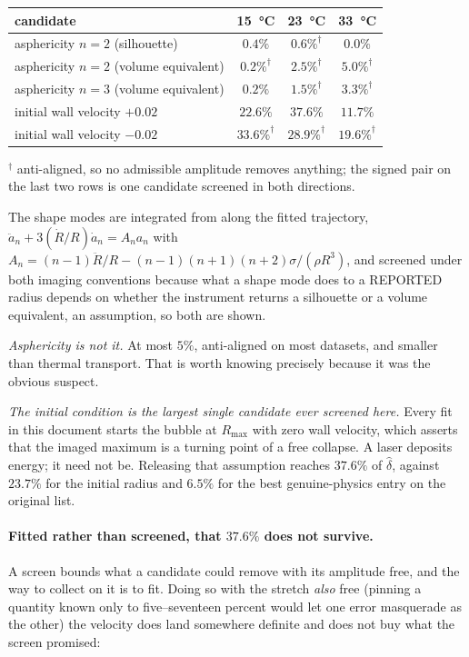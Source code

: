 \documentclass[10pt]{article}
\begin{document}
\begin{center}
\begin{tabular}{lccc}
\toprule
candidate & \SI{15}{\celsius} & \SI{23}{\celsius} & \SI{33}{\celsius} \\
\midrule
asphericity $n=2$ (silhouette) & $0.4\%$ & $0.6\%^\dagger$ & $0.0\%$ \\
asphericity $n=2$ (volume equivalent) & $0.2\%^\dagger$ & $2.5\%^\dagger$ & $5.0\%^\dagger$ \\
asphericity $n=3$ (volume equivalent) & $0.2\%$ & $1.5\%^\dagger$ & $3.3\%^\dagger$ \\
initial wall velocity $+0.02$ & $\mathbf{22.6\%}$ & $\mathbf{37.6\%}$ & $\mathbf{11.7\%}$ \\
initial wall velocity $-0.02$ & $33.6\%^\dagger$ & $28.9\%^\dagger$ & $19.6\%^\dagger$ \\
\bottomrule
\end{tabular}
\end{center}

\noindent $^\dagger$ anti-aligned, so no admissible amplitude removes anything; the signed pair
on the last two rows is one candidate screened in both directions.

The shape modes are integrated from \citet{plesset1954stability} along the fitted trajectory,
$\ddot a_n + 3(\dot R/R)\dot a_n = A_n a_n$ with
$A_n = (n-1)\ddot R/R - (n-1)(n+1)(n+2)\sigma/(\rho R^3)$, and screened under both imaging
conventions because what a shape mode does to a REPORTED radius depends on whether the
instrument returns a silhouette or a volume equivalent, an assumption, so both are shown.

\emph{Asphericity is not it.} At most $5\%$, anti-aligned on most datasets, and smaller than
thermal transport. That is worth knowing precisely because it was the obvious suspect.

\emph{The initial condition is the largest single candidate ever screened here.} Every fit in
this document starts the bubble at $R_{\max}$ with zero wall velocity, which asserts that the
imaged maximum is a turning point of a free collapse. A laser deposits energy; it need not be.
Releasing that assumption reaches $37.6\%$ of $\hat\delta$, against $23.7\%$ for the initial
radius and $6.5\%$ for the best genuine-physics entry on the original list.

\paragraph{Fitted rather than screened, that $37.6\%$ does not survive.} A screen bounds what a
candidate could remove with its amplitude free, and the way to collect on it is to fit. Doing so
with the stretch \emph{also} free (pinning a quantity known only to five--seventeen percent
would let one error masquerade as the other) the velocity does land somewhere definite and
does not buy what the screen promised:
\end{document}
